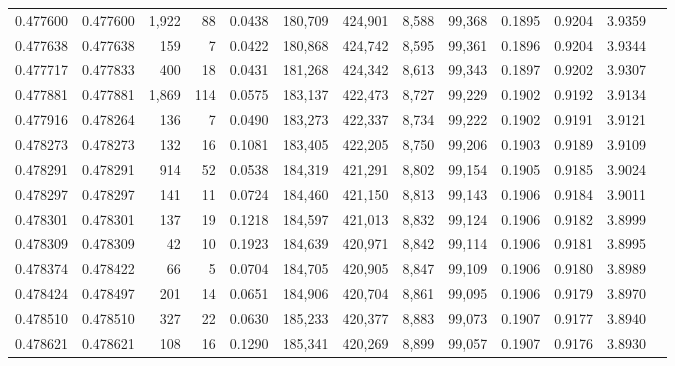 \begin{tabular}{rrrrrrrrrrrrr}
0.477600 & 0.477600 & 1,922 &    88 &                                     0.0438 & 180,709 & 424,901 &   8,588 &  99,368 & 0.1895 & 0.9204 & 3.9359 \\
0.477638 & 0.477638 &   159 &     7 &                                     0.0422 & 180,868 & 424,742 &   8,595 &  99,361 & 0.1896 & 0.9204 & 3.9344 \\
0.477717 & 0.477833 &   400 &    18 &                                     0.0431 & 181,268 & 424,342 &   8,613 &  99,343 & 0.1897 & 0.9202 & 3.9307 \\
0.477881 & 0.477881 & 1,869 &   114 &                                     0.0575 & 183,137 & 422,473 &   8,727 &  99,229 & 0.1902 & 0.9192 & 3.9134 \\
0.477916 & 0.478264 &   136 &     7 &                                     0.0490 & 183,273 & 422,337 &   8,734 &  99,222 & 0.1902 & 0.9191 & 3.9121 \\
0.478273 & 0.478273 &   132 &    16 &                                     0.1081 & 183,405 & 422,205 &   8,750 &  99,206 & 0.1903 & 0.9189 & 3.9109 \\
0.478291 & 0.478291 &   914 &    52 &                                     0.0538 & 184,319 & 421,291 &   8,802 &  99,154 & 0.1905 & 0.9185 & 3.9024 \\
0.478297 & 0.478297 &   141 &    11 &                                     0.0724 & 184,460 & 421,150 &   8,813 &  99,143 & 0.1906 & 0.9184 & 3.9011 \\
0.478301 & 0.478301 &   137 &    19 &                                     0.1218 & 184,597 & 421,013 &   8,832 &  99,124 & 0.1906 & 0.9182 & 3.8999 \\
0.478309 & 0.478309 &    42 &    10 &                                     0.1923 & 184,639 & 420,971 &   8,842 &  99,114 & 0.1906 & 0.9181 & 3.8995 \\
0.478374 & 0.478422 &    66 &     5 &                                     0.0704 & 184,705 & 420,905 &   8,847 &  99,109 & 0.1906 & 0.9180 & 3.8989 \\
0.478424 & 0.478497 &   201 &    14 &                                     0.0651 & 184,906 & 420,704 &   8,861 &  99,095 & 0.1906 & 0.9179 & 3.8970 \\
0.478510 & 0.478510 &   327 &    22 &                                     0.0630 & 185,233 & 420,377 &   8,883 &  99,073 & 0.1907 & 0.9177 & 3.8940 \\
0.478621 & 0.478621 &   108 &    16 &                                     0.1290 & 185,341 & 420,269 &   8,899 &  99,057 & 0.1907 & 0.9176 & 3.8930 \\

\end{tabular}
